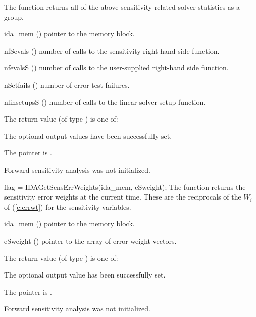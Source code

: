 {
  The function  returns all of the above sensitivity-related solver
  statistics as a group.
}
{
  \begin{args}
  \item[ida\_mem] ()
    pointer to the {\idas} memory block.
  \item[nfSevals] ()
    number of calls to the sensitivity right-hand side function.
  \item[nfevalsS] ()
    number of calls to the user-supplied right-hand side function.
  \item[nSetfails] ()
    number of error test failures.
  \item[nlinsetupsS] ()
    number of calls to the linear solver setup function.
  \end{args}
}
{
  The return value  (of type ) is one of:
  \begin{args}
  \item[\Id{IDA\_SUCCESS}] 
    The optional output values have been successfully set.
  \item[\Id{IDA\_MEM\_NULL}]
    The  pointer is .
  \item[\Id{IDA\_NO\_SENS}]
    Forward sensitivity analysis was not initialized.
  \end{args}
}
{}
{
  flag = IDAGetSensErrWeights(ida\_mem, eSweight);
}
{
  The function  returns the sensitivity error weights at the
  current time. These are the reciprocals of the $W_i$ of (\ref{e:errwt}) for the
  sensitivity variables.
}
{
  \begin{args}
  \item[ida\_mem] ()
    pointer to the {\idas} memory block.
  \item[eSweight] ()
    pointer to the array of error weight vectors.
  \end{args}
}
{
  The return value  (of type ) is one of:
  \begin{args}
  \item[\Id{IDA\_SUCCESS}] 
    The optional output value has been successfully set.
  \item[\Id{IDA\_MEM\_NULL}]
    The  pointer is .
  \item[\Id{IDA\_NO\_SENS}]
    Forward sensitivity analysis was not initialized.
  \end{args}
}
